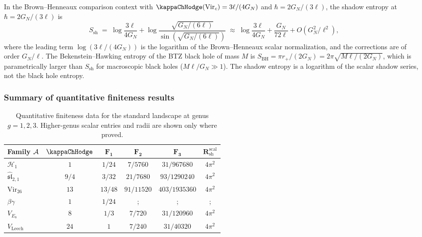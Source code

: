 \begin{remark}
In the Brown--Henneaux comparison context with
$\kappaChHodge(\mathrm{Vir}_c)=3\ell/(4G_N)$ and
$\hbar = 2G_N/(3\ell)$, the shadow entropy at
$\hbar = 2G_N/(3\ell)$ is
\[
S_{\mathrm{sh}} \;=\; \log\frac{3\ell}{4G_N} + \log\frac{\sqrt{G_N/(6\ell)}}{\sin(\sqrt{G_N/(6\ell)})} \;\approx\; \log\frac{3\ell}{4G_N} + \frac{G_N}{72\ell} + O(G_N^2/\ell^2),
\]
where the leading term $\log(3\ell/(4G_N))$ is the logarithm of the
Brown--Henneaux scalar normalization, and the corrections are of order
$G_N/\ell$. The Bekenstein--Hawking entropy of the BTZ black hole of mass
$M$ is $S_{\mathrm{BH}} = \pi r_+/(2G_N) =
2\pi\sqrt{M\ell/(2G_N)}$, which is parametrically larger than
$S_{\mathrm{sh}}$ for macroscopic black holes ($M\ell/G_N \gg 1$). The
shadow entropy is a logarithm of the scalar shadow series, not the black
hole entropy.
\end{remark}

\subsubsection{Summary of quantitative finiteness results}

\begin{table}[ht]
\centering
\caption{Quantitative finiteness data for the standard landscape at genus $g = 1, 2, 3$. Higher-genus scalar entries and radii are shown only where proved.}
\renewcommand{\arraystretch}{1.4}
{\footnotesize
\begin{tabular}{|l|c|c|c|c|c|}
\hline
\textbf{Family $\mathcal{A}$} & $\boldsymbol{\kappaChHodge}$ & $\boldsymbol{F_1}$ & $\boldsymbol{F_2}$ & $\boldsymbol{F_3}$ & $\boldsymbol{R_{\mathrm{sh}}^{\mathrm{scal}}}$ \\
\hline
$\mathcal{H}_1$ & $1$ & $1/24$ & $7/5760$ & $31/967680$ & $4\pi^2$ \\
\hline
$\widehat{\mathfrak{sl}}_{2,1}$ & $9/4$ & $3/32$ & $21/7680$ & $93/1290240$ & $4\pi^2$ \\
\hline
$\mathrm{Vir}_{26}$ & $13$ & $13/48$ & $91/11520$ & $403/1935360$ & $4\pi^2$ \\
\hline
$\beta\gamma$ & $1$ & $1/24$ &; &; &; \\
\hline
$V_{E_8}$ & $8$ & $1/3$ & $7/720$ & $31/120960$ & $4\pi^2$ \\
\hline
$V_{\mathrm{Leech}}$ & $24$ & $1$ & $7/240$ & $31/40320$ & $4\pi^2$ \\
\hline
\end{tabular}}
\end{table}

